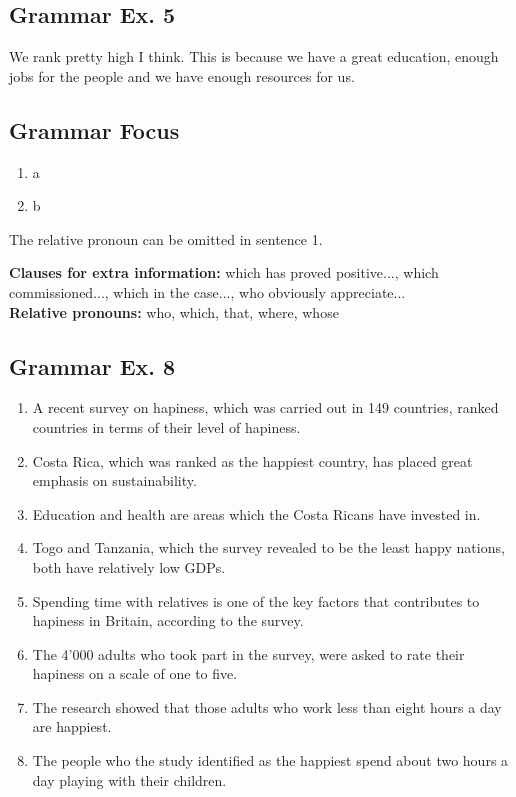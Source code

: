 \documentclass[12pt, a4paper, oneside]{article}
\begin{document}
  \subsection{Grammar Ex. 5}
  We rank pretty high I think. This is because we have a great education, enough jobs for the people and we have enough resources for us.


  \subsection{Grammar Focus}
  \begin{enumerate}[1.]
    \item a
    \item b
  \end{enumerate}

  The relative pronoun can be omitted in sentence 1.

  \textbf{Clauses for extra information:}  which has proved positive..., which commissioned..., which in the case..., who obviously appreciate...\\
  \textbf{Relative pronouns:} who, which, that, where, whose


  \subsection{Grammar Ex. 8}
  \begin{enumerate}[1.]
    \item A recent survey on hapiness, which was carried out in 149 countries, ranked countries in terms of their level of hapiness.
    \item Costa Rica, which was ranked as the happiest country, has placed great emphasis on sustainability.
    \item Education and health are areas which the Costa Ricans have invested in.
    \item Togo and Tanzania, which the survey revealed to be the least happy nations, both have relatively low GDPs.
    \item Spending time with relatives is one of the key factors that contributes to hapiness in Britain, according to the survey.
    \item The 4'000 adults who took part in the survey, were asked to rate their hapiness on a scale of one to five.
    \item The research showed that those adults who work less than eight hours a day are happiest.
    \item The people who the study identified as the happiest spend about two hours a day playing with their children.
  \end{enumerate}
\end{document}
